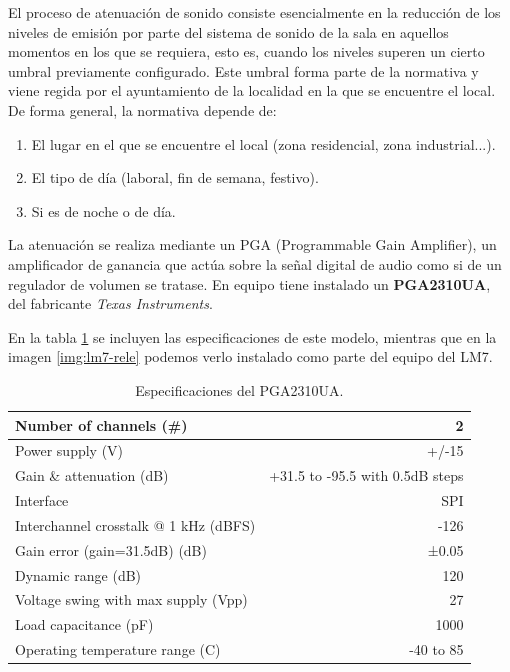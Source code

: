 El proceso de atenuación de sonido consiste esencialmente en la reducción de los niveles de emisión por parte del sistema de sonido de la sala en aquellos momentos en los que se requiera, esto es, cuando los niveles superen un cierto umbral previamente configurado. Este umbral forma parte de la normativa y viene regida por el ayuntamiento de la localidad en la que se encuentre el local. De forma general, la normativa depende de:
\begin{enumerate}
	\item El lugar en el que se encuentre el local (zona residencial, zona industrial...).
	\item El tipo de día (laboral, fin de semana, festivo).
	\item Si es de noche o de día.
\end{enumerate}

La atenuación se realiza mediante un PGA (Programmable Gain Amplifier), un amplificador de ganancia que actúa sobre la señal digital de audio como si de un regulador de volumen se tratase. En equipo tiene instalado un \textbf{PGA2310UA}, del fabricante \textit{Texas Instruments}.

En la tabla \ref{tab:lms7-pga} se incluyen las especificaciones de este modelo, mientras que en la imagen \ref{img:lm7-rele} podemos verlo instalado como parte del equipo del LM7.

\begin{table}[h]
	\centering
	\begin{tabular}{lr}
	\hline
	Number of channels (\#)               & 2                               \\ \hline
	Power supply (V)                      & +/-15                           \\ \hline
	Gain \& attenuation (dB)              & +31.5 to -95.5 with 0.5dB steps \\ \hline
	Interface                             & SPI                             \\ \hline
	Interchannel crosstalk @ 1 kHz (dBFS) & -126                            \\ \hline
	Gain error (gain=31.5dB) (dB)         & ±0.05                           \\ \hline
	Dynamic range (dB)                    & 120                             \\ \hline
	Voltage swing with max supply (Vpp)   & 27                              \\ \hline
	Load capacitance (pF)                 & 1000                            \\ \hline
	Operating temperature range (C)       & -40 to 85                       \\ \hline
	\end{tabular}
	\caption{Especificaciones del PGA2310UA.}
	\label{tab:lms7-pga}
\end{table}

